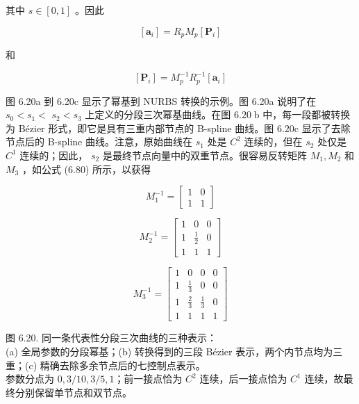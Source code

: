 \documentclass[../main.tex]{subfiles}
\begin{document}
其中 \(s \in  \left\lbrack  {0,1}\right\rbrack\) 。因此

\[
\left\lbrack  {\mathbf{a}}_{i}\right\rbrack   = {R}_{p}{M}_{p}\left\lbrack  {\mathbf{P}}_{i}\right\rbrack
\]



和

\[
\left\lbrack  {\mathbf{P}}_{i}\right\rbrack   = {M}_{p}^{-1}{R}_{p}^{-1}\left\lbrack  {\mathbf{a}}_{i}\right\rbrack   \tag{6.93}
\]

图 6.20a 到 6.20c 显示了幂基到 NURBS 转换的示例。图 6.20a 说明了在 \({s}_{0} < {s}_{1} <\)  \({s}_{2} < {s}_{3}\) 上定义的分段三次幂基曲线。在图 \({6.20}\mathrm{\;b}\) 中，每一段都被转换为 Bézier 形式，即它是具有三重内部节点的 B-spline 曲线。图 \({6.20}\mathrm{c}\) 显示了去除节点后的 B-spline 曲线。注意，原始曲线在 \({s}_{1}\) 处是 \({C}^{2}\) 连续的，但在 \({s}_{2}\) 处仅是 \({C}^{1}\) 连续的；因此， \({s}_{2}\) 是最终节点向量中的双重节点。很容易反转矩阵 \({M}_{1},{M}_{2}\) 和 \({M}_{3}\) ，如公式 (6.80) 所示，以获得

\[
{M}_{1}^{-1} = \left\lbrack  \begin{array}{ll} 1 & 0 \\  1 & 1 \end{array}\right\rbrack
\]

\[
{M}_{2}^{-1} = \left\lbrack  \begin{array}{lll} 1 & 0 & 0 \\  1 & \frac{1}{2} & 0 \\  1 & 1 & 1 \end{array}\right\rbrack
\]


\[
{M}_{3}^{-1} = \left\lbrack  \begin{matrix} 1 & 0 & 0 & 0 \\  1 & \frac{1}{3} & 0 & 0 \\  1 & \frac{2}{3} & \frac{1}{3} & 0 \\  1 & 1 & 1 & 1 \end{matrix}\right\rbrack   \tag{6.94}
\]



\begin{center}
\begin{minipage}{37cm}
\vspace*{.6\baselineskip}
\centering
\begin{minipage}{11.6cm}\centering
{}
\end{minipage}\hfill
\begin{minipage}{24.4cm}\centering
{}
\end{minipage}
\par\smallskip
图 6.20. 同一条代表性分段三次曲线的三种表示：\\
(a) 全局参数的分段幂基；(b) 转换得到的三段 Bézier 表示，两个内节点均为三重；(c) 精确去除多余节点后的七控制点表示。\\
参数分点为 $0,3/10,3/5,1$；前一接点恰为 $C^2$ 连续，后一接点恰为 $C^1$ 连续，故最终分别保留单节点和双节点。
\end{minipage}
\end{center}
\end{document}
